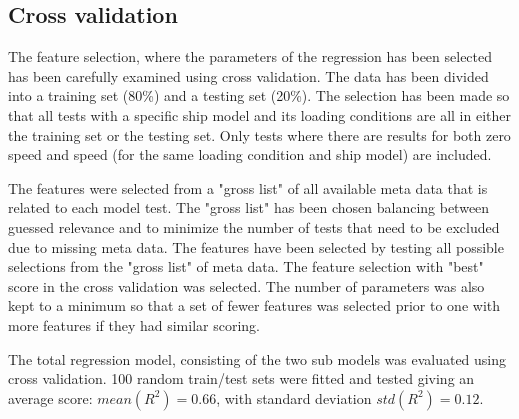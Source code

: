 \subsection{Cross validation}
The feature selection, where the parameters of the regression has been selected has been carefully examined using cross validation. The data has been divided into a  training set (80\%) and a testing set (20\%). The selection has been made so that all tests with a specific ship model and its loading conditions are all in either the training set or the testing set. Only tests where there are results for both zero speed and speed (for the same loading condition and ship model) are included.

The features were selected from a "gross list" of all available meta data that is related to each model test. The "gross list" has been chosen balancing between guessed relevance and to minimize the number of tests that need to be excluded due to missing meta data. 
The features have been selected by testing all possible selections from the "gross list" of meta data. The feature selection with "best" score in the cross validation was selected. The number of parameters was also kept to a minimum so that a set of fewer features was selected prior to one with more features if they had similar scoring. 

The total regression model, consisting of the two sub models was evaluated using cross validation. 100 random train/test sets were fitted and tested giving an average score: $mean(R^2)=0.66$, with standard deviation $std(R^2)=0.12$.